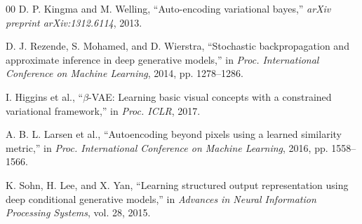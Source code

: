 \documentclass[conference]{IEEEtran}
\begin{document}
\begin{thebibliography}{00}
 D. P. Kingma and M. Welling, ``Auto-encoding variational bayes,'' \textit{arXiv preprint arXiv:1312.6114}, 2013.

 D. J. Rezende, S. Mohamed, and D. Wierstra, ``Stochastic backpropagation and approximate inference in deep generative models,'' in \textit{Proc. International Conference on Machine Learning}, 2014, pp. 1278--1286.

 I. Higgins et al., ``$\beta$-VAE: Learning basic visual concepts with a constrained variational framework,'' in \textit{Proc. ICLR}, 2017.

 A. B. L. Larsen et al., ``Autoencoding beyond pixels using a learned similarity metric,'' in \textit{Proc. International Conference on Machine Learning}, 2016, pp. 1558--1566.

 K. Sohn, H. Lee, and X. Yan, ``Learning structured output representation using deep conditional generative models,'' in \textit{Advances in Neural Information Processing Systems}, vol. 28, 2015.
\end{thebibliography}
\end{document}
